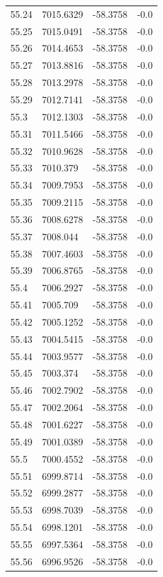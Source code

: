 \begin{table}[H]
\begin{tabular}{llll}
55.24 & 7015.6329 & -58.3758 & -0.0 \\
55.25 & 7015.0491 & -58.3758 & -0.0 \\
55.26 & 7014.4653 & -58.3758 & -0.0 \\
55.27 & 7013.8816 & -58.3758 & -0.0 \\
55.28 & 7013.2978 & -58.3758 & -0.0 \\
55.29 & 7012.7141 & -58.3758 & -0.0 \\
55.3 & 7012.1303 & -58.3758 & -0.0 \\
55.31 & 7011.5466 & -58.3758 & -0.0 \\
55.32 & 7010.9628 & -58.3758 & -0.0 \\
55.33 & 7010.379 & -58.3758 & -0.0 \\
55.34 & 7009.7953 & -58.3758 & -0.0 \\
55.35 & 7009.2115 & -58.3758 & -0.0 \\
55.36 & 7008.6278 & -58.3758 & -0.0 \\
55.37 & 7008.044 & -58.3758 & -0.0 \\
55.38 & 7007.4603 & -58.3758 & -0.0 \\
55.39 & 7006.8765 & -58.3758 & -0.0 \\
55.4 & 7006.2927 & -58.3758 & -0.0 \\
55.41 & 7005.709 & -58.3758 & -0.0 \\
55.42 & 7005.1252 & -58.3758 & -0.0 \\
55.43 & 7004.5415 & -58.3758 & -0.0 \\
55.44 & 7003.9577 & -58.3758 & -0.0 \\
55.45 & 7003.374 & -58.3758 & -0.0 \\
55.46 & 7002.7902 & -58.3758 & -0.0 \\
55.47 & 7002.2064 & -58.3758 & -0.0 \\
55.48 & 7001.6227 & -58.3758 & -0.0 \\
55.49 & 7001.0389 & -58.3758 & -0.0 \\
55.5 & 7000.4552 & -58.3758 & -0.0 \\
55.51 & 6999.8714 & -58.3758 & -0.0 \\
55.52 & 6999.2877 & -58.3758 & -0.0 \\
55.53 & 6998.7039 & -58.3758 & -0.0 \\
55.54 & 6998.1201 & -58.3758 & -0.0 \\
55.55 & 6997.5364 & -58.3758 & -0.0 \\
55.56 & 6996.9526 & -58.3758 & -0.0 \\

\end{tabular}
\end{table}
